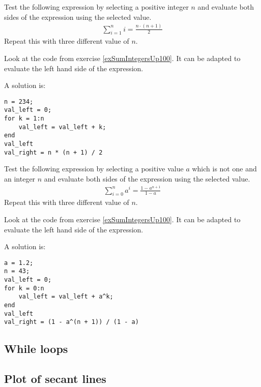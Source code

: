 \begin{ex}
Test the following expression by selecting a positive integer $n$
and evaluate both sides of the expression using the selected value.
\begin{align*}
\sum_{i = 1}^n i = \frac{n \cdot (n + 1)}{2}
\end{align*}
Repeat this with three different value of $n$.
\begin{hint}
Look at the code from exercise \ref{exSumIntegersUp100}.
It can be adapted to evaluate the left hand side of the expression.
\end{hint}
\begin{sol}
A solution is:
\begin{lstlisting}
n = 234;
val_left = 0;
for k = 1:n
    val_left = val_left + k;
end
val_left
val_right = n * (n + 1) / 2
\end{lstlisting}
\end{sol}
\end{ex}


\begin{ex}
Test the following expression by selecting a positive value $a$
which is not one and an integer $n$
and evaluate both sides of the expression using the selected value.
\begin{align*}
\sum_{i = 0}^n a^i = \frac{1 - a^{n + 1}}{1 - a}
\end{align*}
Repeat this with three different value of $n$.
\begin{hint}
Look at the code from exercise \ref{exSumIntegersUp100}.
It can be adapted to evaluate the left hand side of the expression.
\end{hint}
\begin{sol}
A solution is:
\begin{lstlisting}
a = 1.2;
n = 43;
val_left = 0;
for k = 0:n
    val_left = val_left + a^k;
end
val_left
val_right = (1 - a^(n + 1)) / (1 - a)
\end{lstlisting}
\end{sol}
\end{ex}


\subsection{While loops}


\subsection{Plot of secant lines}

